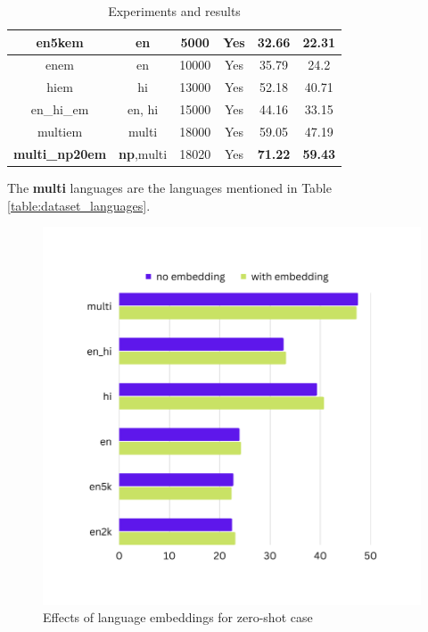 \begin{table}[ht]
\begin{center}
{\begin{tabular}{|c|c|c|c|c|c|}
            en5kem & en & 5000 & Yes & 32.66 & 22.31 \\
            \hline
            enem & en & 10000 & Yes & 35.79 & 24.2 \\
            \hline
            hiem & hi & 13000 & Yes & 52.18 & 40.71 \\
            \hline
            en\_hi\_em & en, hi & 15000 & Yes & 44.16 & 33.15 \\
            \hline
            multiem & multi & 18000 & Yes & 59.05 & 47.19 \\
            \hline
            \textbf{multi\_np20em} & \textbf{np},multi & 18020 & Yes & \textbf{71.22} & \textbf{59.43} \\
            \hline
        \end{tabular}
    }
        \caption{Experiments and results}
        \label{table:experiments_results}
    \end{center}
\end{table}
The \textbf{multi} languages are the languages mentioned in Table \ref{table:dataset_languages}.

\begin{figure}[!h]
    \center
    \includegraphics[scale=0.4]{images/results}
    \caption{Effects of language embeddings for zero-shot case}
    \label{results}
\end{figure}

